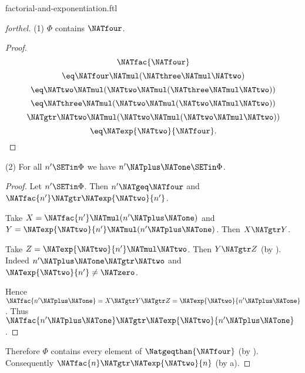 \documentclass{naproche-library}
\begin{document}
\begin{smodule}[title=Factorial and Exponentiation]{factorial-and-exponentiation.ftl}
\begin{proof}[forthel]
  (1) $\Phi$ contains $\NATfour$.
  \begin{proof}
    \[  \NATfac{\NATfour}                                  \]
    \[    \eq \NATfour \NATmul (\NATthree \NATmul \NATtwo)             \]
    \[    \eq \NATtwo \NATmul (\NATtwo \NATmul (\NATthree \NATmul \NATtwo))   \]
    \[    \eq \NATthree \NATmul (\NATtwo \NATmul (\NATtwo \NATmul \NATtwo))   \]
    \[    \NATgtr \NATtwo \NATmul (\NATtwo \NATmul (\NATtwo \NATmul \NATtwo))   \]
    \[    \eq \NATexp{\NATtwo}{\NATfour}.                          \]
  \end{proof}

  (2) For all $n' \SETin \Phi$ we have $n' \NATplus \NATone \SETin \Phi$.
  \begin{proof}
    Let $n' \SETin \Phi$.
    Then $n' \NATgeq \NATfour$ and $\NATfac{n'} \NATgtr \NATexp{\NATtwo}{n'}$.

    Take $X = \NATfac{n'} \NATmul (n' \NATplus \NATone)$ and $Y = \NATexp{\NATtwo}{n'} \NATmul (n' \NATplus \NATone)$.
    Then $X \NATgtr Y$.

    Take $Z = \NATexp{\NATtwo}{n'} \NATmul \NATtwo$.
    Then $Y \NATgtr Z$ (by ).
    Indeed $n' \NATplus \NATone \NATgtr \NATtwo$ and $\NATexp{\NATtwo}{n'} \neq \NATzero$.

    Hence $\NATfac{n' \NATplus \NATone} = X \NATgtr Y \NATgtr Z = \NATexp{\NATtwo}{n' \NATplus \NATone}$.
    Thus $\NATfac{n' \NATplus \NATone} \NATgtr \NATexp{\NATtwo}{n' \NATplus \NATone}$.
  \end{proof}

  Therefore $\Phi$ contains every element of $\Natgeqthan{\NATfour}$ (by ).
  Consequently $\NATfac{n} \NATgtr \NATexp{\NATtwo}{n}$ (by a).
\end{proof}
\end{smodule}
\end{document}
